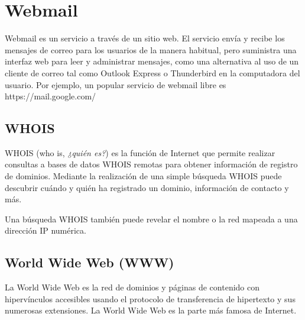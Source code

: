 \section{Webmail}\label{webmail}

Webmail es un servicio a través de un sitio web. El servicio envía y
recibe los mensajes de correo para los usuarios de la manera habitual,
pero suministra una interfaz web para leer y administrar mensajes, como
una alternativa al uso de un cliente de correo tal como Outlook Express
o Thunderbird en la computadora del usuario. Por ejemplo, un popular
servicio de webmail libre es https://mail.google.com/

\subsection{WHOIS}\label{whois}

WHOIS (who is, \emph{¿quién es?}) es la función de Internet que permite
realizar consultas a bases de datos WHOIS remotas para obtener
información de registro de dominios. Mediante la realización de una
simple búsqueda WHOIS puede descubrir cuándo y quién ha registrado un
dominio, información de contacto y más.

Una búsqueda WHOIS también puede revelar el nombre o la red mapeada a
una dirección IP numérica.

\subsection{World Wide Web (WWW)}\label{world-wide-web-www}

La World Wide Web es la red de dominios y páginas de contenido con
hipervínculos accesibles usando el protocolo de transferencia de
hipertexto y sus numerosas extensiones. La World Wide Web es la parte
más famosa de Internet.
